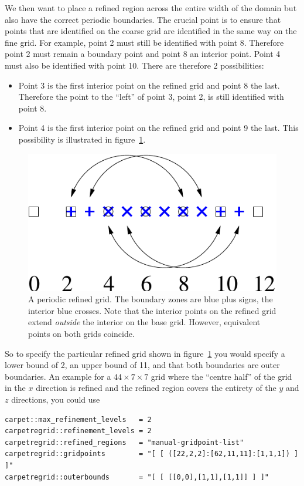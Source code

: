 \begin{enumerate}
  We then want to place a refined region across the entire width of
  the domain but also have the correct periodic boundaries. The
  crucial point is to ensure that points that are identified on the
  coarse grid are identified in the same way on the fine grid. For
  example, point 2 must still be identified with point 8. Therefore
  point 2 must remain a boundary point and point 8 an interior
  point. Point 4 must also be identified with point 10. There are
  therefore 2 possibilities:
  \begin{itemize}
  \item Point 3 is the first interior point on the refined grid and
    point 8 the last. Therefore the point to the ``left'' of point 3,
    point 2, is still identified with point 8.
  \item Point 4 is the first interior point on the refined grid and
    point 9 the last. This possibility is illustrated in
    figure~\ref{fig:Periodic2}.
  \end{itemize}
  \begin{figure}[htbp]
    \begin{center}
      \includegraphics[scale=0.5]{Periodic2}
      \caption{A periodic refined grid. The boundary zones are blue
        plus signs, the interior blue crosses. Note that the interior
        points on the refined grid extend \textit{outside} the
        interior on the base grid. However, equivalent points on both
        grids coincide.}
      \label{fig:Periodic2}
    \end{center}
  \end{figure}
  
  So to specify the particular refined grid shown in
  figure~\ref{fig:Periodic2} you would specify a lower bound of 2, an
  upper bound of 11, and that both boundaries are outer boundaries. An
  example for a $44 \times 7 \times 7$ grid where the ``centre half''
  of the grid in the $x$ direction is refined and the refined region
  covers the entirety of the $y$ and $z$ directions, you could use
\begin{verbatim}
carpet::max_refinement_levels   = 2
carpetregrid::refinement_levels = 2
carpetregrid::refined_regions   = "manual-gridpoint-list"
carpetregrid::gridpoints        = "[ [ ([22,2,2]:[62,11,11]:[1,1,1]) ] ]"
carpetregrid::outerbounds       = "[ [ [[0,0],[1,1],[1,1]] ] ]"
\end{verbatim}

\end{enumerate}

